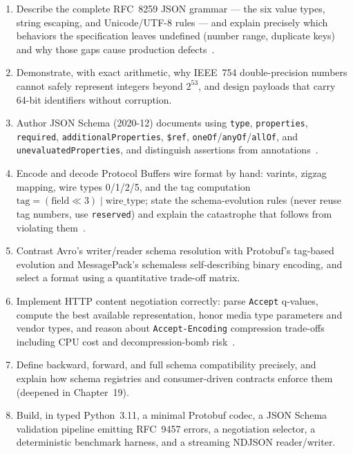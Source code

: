 \begin{enumerate}[label=\textbf{LO-\arabic*.}, leftmargin=2.6cm]
  \item Describe the complete RFC~8259 JSON grammar --- the six value types, string
        escaping, and Unicode/UTF-8 rules --- and explain precisely which behaviors the
        specification leaves undefined (number range, duplicate keys) and why those
        gaps cause production defects~\cite{rfc8259}.
  \item Demonstrate, with exact arithmetic, why IEEE~754 double-precision numbers
        cannot safely represent integers beyond $2^{53}$, and design payloads that
        carry 64-bit identifiers without corruption.
  \item Author JSON Schema (2020-12) documents using \texttt{type},
        \texttt{properties}, \texttt{required}, \texttt{additionalProperties},
        \texttt{\$ref}, \texttt{oneOf}/\texttt{anyOf}/\texttt{allOf}, and
        \texttt{unevaluatedProperties}, and distinguish assertions from
        annotations~\cite{jsonschemadocs}.
  \item Encode and decode Protocol Buffers wire format by hand: varints, zigzag
        mapping, wire types 0/1/2/5, and the tag computation
        $\text{tag} = (\text{field} \ll 3) \mathbin{|} \text{wire\_type}$; state the
        schema-evolution rules (never reuse tag numbers, use \texttt{reserved}) and
        explain the catastrophe that follows from violating
        them~\cite{protobufdocs}.
  \item Contrast Avro's writer/reader schema resolution with Protobuf's tag-based
        evolution and MessagePack's schemaless self-describing binary encoding, and
        select a format using a quantitative trade-off matrix.
  \item Implement HTTP content negotiation correctly: parse \texttt{Accept} q-values,
        compute the best available representation, honor media type parameters and
        vendor types, and reason about \texttt{Accept-Encoding} compression
        trade-offs including CPU cost and decompression-bomb risk~\cite{rfc9110}.
  \item Define backward, forward, and full schema compatibility precisely, and explain
        how schema registries and consumer-driven contracts enforce them (deepened in
        Chapter~19).
  \item Build, in typed Python~3.11, a minimal Protobuf codec, a JSON Schema
        validation pipeline emitting RFC~9457 errors, a negotiation selector, a
        deterministic benchmark harness, and a streaming NDJSON reader/writer.
\end{enumerate}

